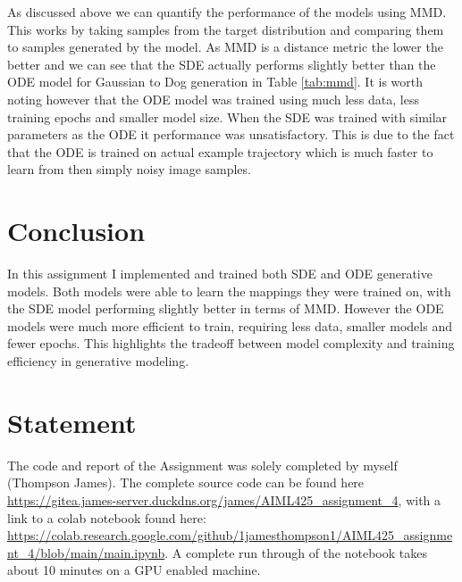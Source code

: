 \documentclass[conference,a4paper]{IEEEtran}
\begin{document}
As discussed above we can quantify the performance of the models using MMD. This works by taking samples from the target distribution and comparing them to samples generated by the model. As MMD is a distance metric the lower the better and we can see that the SDE actually performs slightly better than the ODE model for Gaussian to Dog generation in Table \ref{tab:mmd}. It is worth noting however that the ODE model was trained using much less data, less training epochs and smaller model size. When the SDE was trained with similar parameters as the ODE it performance was unsatisfactory. This is due to the fact that the ODE is trained on actual example trajectory which is much faster to learn from then simply noisy image samples.
\section{Conclusion}

In this assignment I implemented and trained both SDE and ODE generative models. Both models were able to learn the mappings they were trained on, with the SDE model performing slightly better in terms of MMD. However the ODE models were much more efficient to train, requiring less data, smaller models and fewer epochs. This highlights the tradeoff between model complexity and training efficiency in generative modeling.


\newpage
\section*{Statement}

The code and report of the Assignment was solely completed by myself (Thompson James). The complete source code can be found here \url{https://gitea.james-server.duckdns.org/james/AIML425\_assignment\_4}, with a link to a colab notebook found here: \url{https://colab.research.google.com/github/1jamesthompson1/AIML425_assignment_4/blob/main/main.ipynb}. A complete run through of the notebook takes about 10 minutes on a GPU enabled machine.

\end{document}
